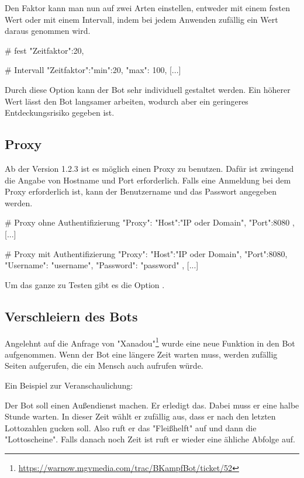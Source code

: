 \documentclass{scrartcl}
\begin{document}
Den Faktor kann man nun auf zwei Arten einstellen, entweder mit einem festen Wert oder mit einem Intervall, indem bei jedem Anwenden zufällig ein Wert daraus genommen wird.

\begin{code}[language=bash]
[...]
# fest
"Zeitfaktor":20,

# Intervall
"Zeitfaktor":{"min":20, "max": 100},
[...]
\end{code}

Durch diese Option kann der Bot sehr individuell gestaltet werden. Ein höherer Wert lässt den Bot langsamer arbeiten, wodurch aber ein geringeres Entdeckungsrisiko gegeben ist.

\subsection{Proxy}
\label{Proxy}

Ab der Version 1.2.3 ist es möglich einen Proxy zu benutzen. Dafür ist zwingend
die Angabe von Hostname und Port erforderlich. Falls eine Anmeldung bei dem
Proxy erforderlich ist, kann der Benutzername und das Passwort angegeben werden.

\begin{code}[language=bash]
[...]
# Proxy ohne Authentifizierung
"Proxy":{
	"Host":"IP oder Domain",
	"Port":8080
},
[...]
\end{code}

\begin{code}[language=bash]
[...]
# Proxy mit Authentifizierung
"Proxy":{
	"Host":"IP oder Domain",
	"Port":8080,
	"Username": "username",
	"Password": "password"
},
[...]
\end{code}

Um das ganze zu Testen gibt es die Option .

\subsection{Verschleiern des Bots}
\label{Verschleiern}

Angelehnt auf die Anfrage von
"Xanadou"\footnote{\url{https://warnow.mgvmedia.com/trac/BKampfBot/ticket/52}}
wurde eine neue Funktion in den Bot aufgenommen. Wenn der Bot eine längere Zeit
warten muss, werden zufällig Seiten aufgerufen, die ein Mensch auch aufrufen
würde.

Ein Beispiel zur Veranschaulichung:

Der Bot soll einen Außendienst machen. Er erledigt das. Dabei muss er eine halbe
Stunde warten. In dieser Zeit wählt er zufällig aus, dass er nach den letzten
Lottozahlen gucken soll. Also ruft er das "Fleißhelft" auf und dann die
"Lottoscheine". Falls danach noch Zeit ist ruft er wieder eine ähliche Abfolge
auf.
\end{document}
